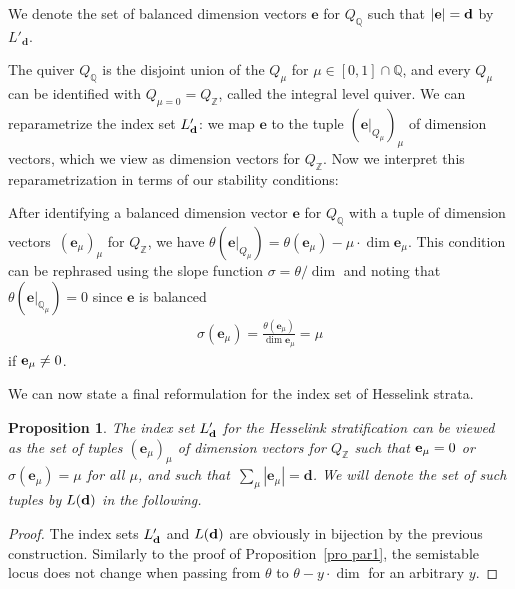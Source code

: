 \documentclass[pdftex]{sigma}
\numberwithin{equation}{section}
\newtheorem{Proposition}[Theorem]{Proposition}
\theoremstyle{definition}
\begin{document}
We denote the set of balanced dimension vectors $\mathbf{e}$ for ${Q}_{\mathbb{Q}}$ such that $|{\bf e}| = {\bf d}$ by $L'_\mathbf{d}$.

The quiver $Q_\mathbb{Q}$ is the disjoint union of the $Q_\mu$ for $\mu\in[0,1]\cap\mathbb{Q}$, and every $Q_\mu$ can be identified with $Q_{\mu=0}=Q_\mathbb{Z}$, called the integral level quiver. We can reparametrize the index set $L'_{\bf d}$: we map $\mathbf{e}$ to the tuple $(\mathbf{e}|_{Q_\mu})_\mu$ of dimension vectors, which we view as dimension vectors for $Q_\mathbb{Z}$. %
Now we interpret this reparametrization in terms of our stability conditions:

After identifying a balanced dimension vector $\mathbf{e}$ for $Q_{\mathbb{Q}}$ with a tuple of dimension vectors~$(\mathbf{e}_\mu)_\mu$ for $Q_{\mathbb{Z}}$, we have
$
\theta (\mathbf{e}|_{Q_\mu}) = \theta (\mathbf{e}_\mu) -\mu\cdot\dim \mathbf{e}_\mu $.
This condition can be rephrased using the slope function $\sigma=\theta/{\dim}$ and noting that $\theta (\mathbf{e}|_{\mathbb{Q}_{\mu}}) = 0$ since $\mathbf{e}$ is balanced
\begin{align*}
\sigma ( \mathbf{e}_\mu) = \frac{\theta(\mathbf{e}_{\mu})}{\dim \mathbf{e}_\mu} = \mu
\end{align*}
if ${\bf e}_\mu\not=0$.

We can now state a final reformulation for the index set of Hesselink strata.

\begin{Proposition} \label{prop par2}
The index set $L'_{\bf d}$ for the Hesselink stratification can be viewed as the set of tuples $(\mathbf{e}_\mu)_\mu$ of dimension vectors for $Q_\mathbb{Z}$ such that ${\bf e}_\mu=0$ or $\sigma(\mathbf{e}_\mu)%
=\mu$ for all $\mu$, and such that~${\sum_\mu|\mathbf{e}_\mu|=\mathbf{d}}$. We will denote the set of such tuples by $L({\bf d})$ in the following.
\end{Proposition}

\begin{proof}
The index sets $L'_{\bf d}$ and $L({\bf d})$ are obviously in bijection by the previous construction. Similarly to the proof of Proposition~\ref{pro par1}, the semistable locus does not change when passing from $\theta$ to $\theta - y\cdot\dim $ for an arbitrary $y$.
\end{proof}
\end{document}
